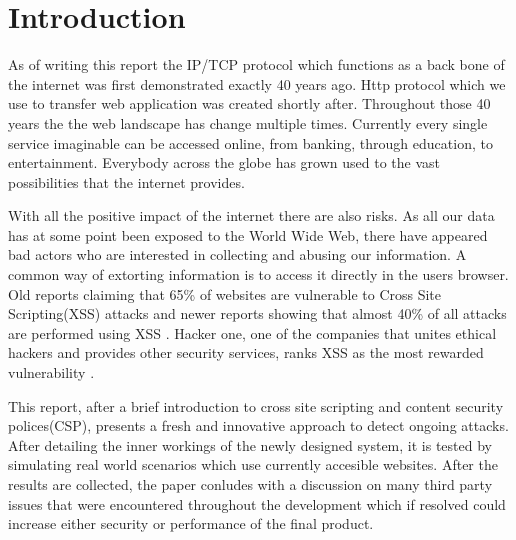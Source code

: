 \chapter{Introduction}

As of writing this report the IP/TCP protocol which functions as a back bone of the internet was first demonstrated exactly 40 years ago.
Http protocol which we use to transfer web application was created shortly after.
Throughout those 40 years the the web landscape has change multiple times.
Currently every single service imaginable can be accessed online, from banking, through education, to entertainment.
Everybody across the globe has grown used to the vast possibilities that the internet provides.

With all the positive impact of the internet there are also risks.
As all our data has at some point been exposed to the World Wide Web, there have appeared bad actors who are interested in collecting and abusing our information.
A common way of extorting information is to access it directly in the users browser.
Old reports claiming that 65\% of websites are vulnerable to Cross Site Scripting(XSS) attacks \cite{xssEverywhere} and newer reports showing that almost 40\% of all attacks are performed using XSS \cite{xssEverywhere2}.
Hacker one, one of the companies that unites ethical hackers and provides other security services, ranks XSS as the most rewarded vulnerability \cite{xssMoney}.

This report, after a brief introduction to cross site scripting and content security polices(CSP), presents a fresh and innovative approach to detect ongoing attacks.
After detailing the inner workings of the newly designed system, it is tested by simulating real world scenarios which use currently accesible websites.
After the results are collected, the paper conludes with a discussion on many third party issues that were encountered throughout the development which if resolved could increase either security or performance of the final product.



